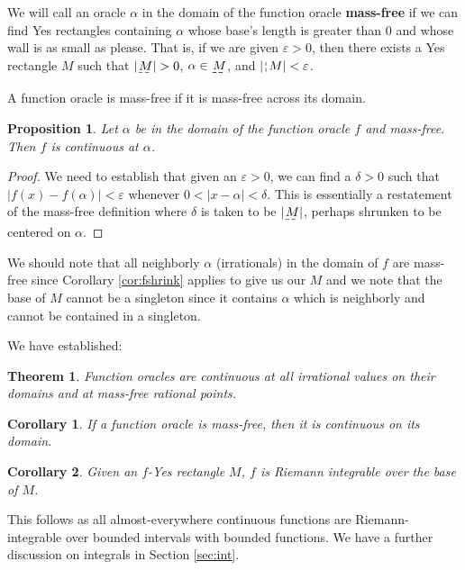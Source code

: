 \documentclass[12pt]{article}
\newtheorem{theorem}{Theorem}[subsection]
\newtheorem{corollary}{Corollary}[subsection]
\newtheorem{proposition}{Proposition}[subsection]
\begin{document}
We will call an oracle $\alpha$ in the domain of the function oracle \textbf{mass-free} if we can find Yes rectangles containing $\alpha$ whose base's length is greater than 0 and whose wall is as small as please. That is, if we are given $\varepsilon > 0$, then there exists a Yes rectangle $M$ such that $|\base{M}| > 0$, $\alpha \in \base{M}$, and $|\wall{M}| < \varepsilon$.
 
 A function oracle is mass-free if it is mass-free across its domain.  

\begin{proposition}
Let $\alpha$ be in the domain of the function oracle $f$ and mass-free. Then $f$ is continuous at $\alpha$.
\end{proposition}

\begin{proof}
    We need to establish that given an $\varepsilon > 0$, we can find a $\delta > 0$ such that $|f(x) - f(\alpha)| < \varepsilon$ whenever $0 < |x - \alpha| < \delta$. This is essentially a restatement of the mass-free definition where $\delta$ is taken to be $|\base{M}|$, perhaps shrunken to be centered on $\alpha$. 
\end{proof}

We should note that all neighborly $\alpha$ (irrationals) in the domain of $f$ are mass-free since Corollary \ref{cor:fshrink} applies to give us our $M$ and we note that the base of $M$ cannot be a singleton since it contains $\alpha$ which is neighborly and cannot be contained in a singleton.

We have established:

\begin{theorem}
    Function oracles are continuous at all irrational values on their domains and at mass-free rational points. 
\end{theorem}

\begin{corollary}
If a function oracle is mass-free, then it is continuous on its domain. 
\end{corollary}

\begin{corollary}
Given an $f$-Yes rectangle $M$, $f$ is Riemann integrable over the base of $M$. 
\end{corollary}

This follows as all almost-everywhere continuous functions are Riemann-integrable over bounded intervals with bounded functions. We have a further  discussion on integrals in Section \ref{sec:int}.
\end{document}
